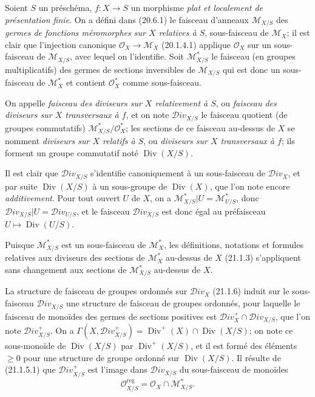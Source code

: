 \begin{env}[21.15.1]
\label{IV.21.15.1}
Soient $S$ un préschéma, $f:X\to S$ un morphisme \emph{plat et localement de
présentation finie}. On a défini dans (20.6.1) le faisceau d'anneaux
$\mathscr M_{X/S}$ des \emph{germes de fonctions méromorphes sur $X$ relatives à
$S$}, sous-faisceau de $\mathscr M_X$; il est clair que l'injection canonique
$\mathcal O_X\to\mathscr M_X$ (20.1.4.1) applique $\mathcal O_X$ sur un
sous-faisceau de $\mathscr M_{X/S}$, avec lequel on l'identifie. Soit
$\mathscr M_{X/S}^*$ le faisceau (en groupes multiplicatifs) des germes de sections
inversibles de $\mathscr M_{X/S}$ qui est donc un sous-faisceau de $\mathscr M_X^*$
et contient $\mathcal O_X^*$ comme sous-faisceau.
\end{env}

\begin{definition}[21.15.2]
On appelle \emph{faisceau des diviseurs sur $X$ relativement à $S$}, ou
\emph{faisceau des diviseurs sur $X$ transversaux à $f$}, et on note
$\mathscr{D}iv_{X/S}$ le faisceau quotient (de groupes commutatifs)
$\mathscr M_{X/S}^*/\mathcal O_X^*$; les sections de ce faisceau au-dessus de $X$ se
nomment \emph{diviseurs sur $X$ relatifs à $S$}, ou \emph{diviseurs sur $X$
transversaux à $f$}; ils forment un groupe commutatif noté $\operatorname{Div}(X/S)$.
\end{definition}

Il est clair que $\mathscr{D}iv_{X/S}$ s'identifie canoniquement à un sous-faisceau de
$\mathscr{D}iv_X$, et par suite $\operatorname{Div}(X/S)$ à un sous-groupe de
$\operatorname{Div}(X)$, que l'on note encore \emph{additivement}. Pour
tout ouvert $U$ de $X$, on a
$\mathscr M_{X/S}^*|U=\mathscr M_{U/S}^*$, donc
$\mathscr{D}iv_{X/S}|U=\mathscr{D}iv_{U/S}$, et le faisceau
$\mathscr{D}iv_{X/S}$ est donc égal au préfaisceau
$U\mapsto\operatorname{Div}(U/S)$.

Puisque $\mathscr M_{X/S}^*$ est un sous-faisceau de $\mathscr M_X^*$, les
définitions, notations et formules relatives aux diviseurs des sections de
$\mathscr M_X^*$ au-dessus de $X$ (21.1.3) s'appliquent sans changement aux sections
de $\mathscr M_{X/S}^*$ au-dessus de $X$.

\begin{env}[21.15.3]
\label{IV.21.15.3}
La structure de faisceau de groupes ordonnés sur $\mathscr{D}iv_X$ (21.1.6) induit
sur le sous-faisceau $\mathscr{D}iv_{X/S}$ une structure de faisceau de groupes
ordonnés, pour laquelle le faisceau de monoïdes des germes de sections positives est
$\mathscr{D}iv_X^+\cap\mathscr{D}iv_{X/S}$, que l'on note
$\mathscr{D}iv_{X/S}^+$. On a
$\Gamma(X,\mathscr{D}iv_{X/S}^+)=\operatorname{Div}^+(X)\cap
\operatorname{Div}(X/S)$; on note ce sous-monoïde de $\operatorname{Div}(X/S)$ par
$\operatorname{Div}^+(X/S)$, et il est formé des éléments $\geq0$ pour une structure
de groupe ordonné sur $\operatorname{Div}(X/S)$. Il résulte de (21.1.5.1) que
$\mathscr{D}iv_{X/S}^+$ est l'image dans $\mathscr{D}iv_{X/S}$ du sous-faisceau de
monoïdes
\[
\label{IV.21.15.3.1}
  \mathcal O_{X/S}^{\mathrm{reg}}=\mathcal O_X\cap\mathscr M_{X/S}^*.
  \tag{21.15.3.1}
\]
\end{env}

